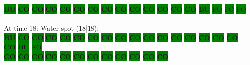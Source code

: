 \colorbox{green}{\color[rgb]{1,0,0}\textbf{BU}}%
\colorbox{green}{\color[rgb]{0,0,0}\textbf{CO}}%
\colorbox{green}{\color[rgb]{0,0,0}\textbf{CO}}%
\colorbox{green}{\color[rgb]{0,0,0}\textbf{CO}}%
\colorbox{green}{\color[rgb]{0,0,0}\textbf{CO}}%
\colorbox{green}{\color[rgb]{0,0,0}\textbf{CO}}%
\colorbox{green}{\color[rgb]{0,0,0}\textbf{CO}}%
\colorbox{green}{\color[rgb]{0,0,0}\textbf{CO}}%
\colorbox{green}{\color[rgb]{0,0,0}\textbf{CO}}%
\colorbox{green}{\color[rgb]{0,0,0}\textbf{CO}}%
\colorbox{green}{\color[rgb]{0,0,0}\textbf{CO}}%
\colorbox{green}{\color[rgb]{0,0,0}\textbf{CO}}%
\colorbox{green}{\color[rgb]{0,0,0}\textbf{CO}}%
\colorbox{green}{\color[rgb]{0,0,0}\textbf{CO}}%
\colorbox{green}{\color[rgb]{1,0,0}\textbf{BU}}%
\colorbox{green}{\color[gray]{0.75}FO}%
\colorbox{green}{\color[gray]{0.75}FO}%
\colorbox{green}{\color[gray]{0.75}FO}%
\\
\\
At time 18: Water spot (18|18):
\\
\colorbox{green}{\color[rgb]{1,0,0}\textbf{BU}}%
\colorbox{green}{\color[rgb]{0,0,0}\textbf{CO}}%
\colorbox{green}{\color[rgb]{0,0,0}\textbf{CO}}%
\colorbox{green}{\color[rgb]{0,0,0}\textbf{CO}}%
\colorbox{green}{\color[rgb]{0,0,0}\textbf{CO}}%
\colorbox{green}{\color[rgb]{0,0,0}\textbf{CO}}%
\colorbox{green}{\color[rgb]{0,0,0}\textbf{CO}}%
\colorbox{green}{\color[rgb]{0,0,0}\textbf{CO}}%
\colorbox{green}{\color[rgb]{0,0,0}\textbf{CO}}%
\colorbox{green}{\color[rgb]{0,0,0}\textbf{CO}}%
\colorbox{green}{\color[rgb]{0,0,0}\textbf{CO}}%
\colorbox{green}{\color[rgb]{0,0,0}\textbf{CO}}%
\colorbox{green}{\color[rgb]{0,0,0}\textbf{CO}}%
\colorbox{green}{\color[rgb]{0,0,0}\textbf{CO}}%
\colorbox{green}{\color[rgb]{0,0,0}\textbf{CO}}%
\colorbox{green}{\color[rgb]{0,0,0}\textbf{CO}}%
\colorbox{green}{\color[rgb]{0,0,0}\textbf{CO}}%
\colorbox{green}{\color[rgb]{0,0,0}\textbf{CO}}%
\colorbox{green}{\color[rgb]{1,0,0}\textbf{BU}}%
\colorbox{green}{\color[gray]{0.75}FO}%
\\
\colorbox{green}{\color[rgb]{0,0,0}\textbf{CO}}%
\colorbox{green}{\color[rgb]{0,0,0}\textbf{CO}}%
\colorbox{green}{\color[rgb]{0,0,0}\textbf{CO}}%
\colorbox{green}{\color[rgb]{0,0,0}\textbf{CO}}%
\colorbox{green}{\color[rgb]{0,0,0}\textbf{CO}}%
\colorbox{green}{\color[rgb]{0,0,0}\textbf{CO}}%
\colorbox{green}{\color[rgb]{0,0,0}\textbf{CO}}%
\colorbox{green}{\color[rgb]{0,0,0}\textbf{CO}}%
\colorbox{green}{\color[rgb]{0,0,0}\textbf{CO}}%
\colorbox{green}{\color[rgb]{0,0,0}\textbf{CO}}%
\colorbox{green}{\color[rgb]{0,0,0}\textbf{CO}}%
\colorbox{green}{\color[rgb]{0,0,0}\textbf{CO}}%
